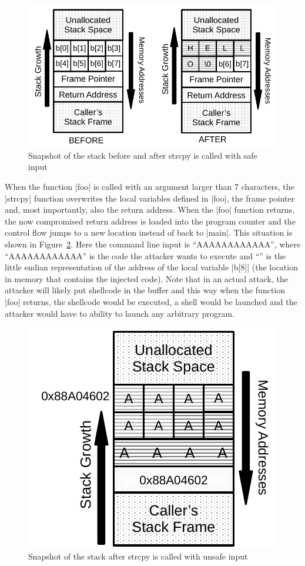 \begin{figure}[ht!]
\centering
\includegraphics[width=0.7\columnwidth]{pictures/stack_overflow_1.pdf}
\caption{Snapshot of the stack before and after strcpy is called with safe input}
\label{fig:stack_overflow_1}
\end{figure}

When the function |foo| is called with an argument larger than 7 characters, the |strcpy| function overwrites the local variables defined in |foo|, the frame pointer and, most importantly, also the return address. When the |foo| function returns, the now compromised return address is loaded into the program counter and the control flow jumps to a new location instead of back to |main|. This situation is shown in Figure~\ref{fig:stack_overflow_2}. Here the command line input is ``AAAAAAAAAAAA'', where ``AAAAAAAAAAAA'' is the code the attacker wants to execute and ``'' is the little endian representation of the address of the local variable |b[8]| (the location in memory that contains the injected code). Note that in an actual attack, the attacker will likely put shellcode in the buffer and this way when the function |foo| returns, the shellcode would be executed, a shell would be launched and the attacker would have to ability to launch any arbitrary program.

\begin{figure}[ht!]
\centering
\includegraphics[width=0.35\columnwidth]{pictures/stack_overflow_2.pdf}
\caption{Snapshot of the stack after strcpy is called with unsafe input}
\label{fig:stack_overflow_2}
\end{figure}

